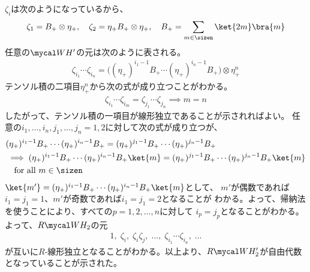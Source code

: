 {	$\zeta_i$は次のようになっているから、
	\begin{equation*}\begin{split}
		\zeta_1 = B_+\otimes\eta_+,\quad \zeta_2 = \eta_+B_+\otimes\eta_+
		,\quad B_+ = \sum_{m\in\sizen}\ket{2m}\bra{m}
	\end{split}\end{equation*}
	任意の$\W H'$の元は次のように表される。
	\begin{equation*}\begin{split}
		\zeta_{i_1}\cdots\zeta_{i_n}
		= \biggl((\eta_+)^{i_1-1}B_+\cdots(\eta_+)^{i_n-1}B_+\biggr)
		\otimes\eta_+^n
	\end{split}\end{equation*}
	テンソル積の二項目$\eta_+^n$から次の式が成り立つことがわかる。
	\begin{equation*}\begin{split}
		\zeta_{i_1}\cdots\zeta_{i_m} = \zeta_{j_1}\cdots\zeta_{j_n}
		\implies m = n
	\end{split}\end{equation*}
	したがって、テンソル積の一項目が線形独立であることが示されればよい。
	任意の$i_1,\dots,i_n,j_1,\dots,j_n=1,2$に対して次の式が成り立つが、
	\begin{equation*}\begin{split}
		& (\eta_+)^{i_1-1}B_+\cdots(\eta_+)^{i_n-1}B_+
			= (\eta_+)^{j_1-1}B_+\cdots(\eta_+)^{j_n-1}B_+ \\
		& \implies (\eta_+)^{i_1-1}B_+\cdots(\eta_+)^{i_n-1}B_+\ket{m}
			= (\eta_+)^{j_1-1}B_+\cdots(\eta_+)^{j_n-1}B_+\ket{m} \\
		& \quad\text{for all } m\in\sizen \\
	\end{split}\end{equation*}
	$\ket{m'}=(\eta_+)^{i_1-1}B_+\cdots(\eta_+)^{i_n-1}B_+\ket{m}$として、
	$m'$が偶数であれば$i_1=j_1=1$、$m'$が奇数であれば$i_1=j_1=2$となることが
	わかる。よって、帰納法を使うことにより、すべての$p=1,2,\dots,n$に対して
	$i_p=j_p$となることがわかる。よって、$R\W H_2$の元
	\begin{equation*}\begin{split}
		1,\; \zeta_i,\; \zeta_i\zeta_j,\;\dots,\;
		\zeta_{i_1}\cdots\zeta_{i_n},\;\dots
	\end{split}\end{equation*}
	が互いに$R$-線形独立となることがわかる。以上より、$R\W H_2'$が自由代数
	となっていることが示された。

}

